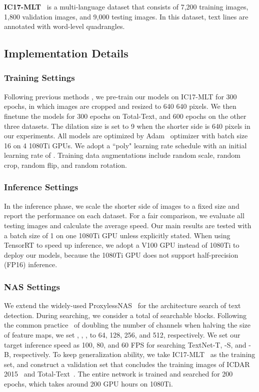 \documentclass[lettersize,journal]{IEEEtran}
\begin{document}
\noindent \textbf{IC17-MLT}~\cite{nayef2017icdar2017} is a multi-language dataset that consists of 7,200 training images, 1,800 validation images, and 9,000 testing images. In this dataset, text lines 
are annotated with word-level quadrangles. 


\subsection{Implementation Details}



\subsubsection{Training Settings} 
Following previous methods \cite{feng2019textdragon,wang2019shape,xie2021polarmask++,xie2019scene}, we pre-train our models on IC17-MLT for 300 epochs, in which images are cropped and resized to 640  640 pixels. 
We then finetune the models for 300 epochs on Total-Text, and 600 epochs on the other three datasets.
The dilation size  is set to 9 when the shorter side is 640 pixels in our experiments.
All models are optimized by Adam~\cite{kingma2014adam} optimizer with batch size 16 on 4 1080Ti GPUs.
We adopt a ``poly" learning rate schedule with an initial learning rate of .
Training data augmentations include random scale, random crop, random flip, and random rotation.



\subsubsection{Inference Settings}
In the inference phase, we scale the shorter side of images to a fixed size and report the performance on each dataset. 
For a fair comparison, we evaluate all testing images and calculate the average speed.
Our main results are tested with a batch size of 1 on one 1080Ti GPU unless explicitly stated.
When using TensorRT \cite{vanholder2016efficient} to speed up inference, we adopt a V100 GPU instead of 1080Ti to deploy our models, because the 1080Ti GPU does not support half-precision (FP16) inference.



\subsubsection{NAS Settings}
We extend the widely-used ProxylessNAS~\cite{cai2018proxylessnas} for the architecture search of text detection.
During searching, we consider a total of  searchable blocks.
Following the common practice~\cite{he2016deep} of doubling the number of channels when halving the size of feature maps, we set , , ,  to 64, 128, 256, and 512, respectively. 
We set our target inference speed  as 100, 80, and 60 FPS for searching TextNet-T, -S, and -B, respectively.
To keep generalization ability, we take IC17-MLT~\cite{nayef2017icdar2017} as the training set, and construct a validation set that concludes the training images of ICDAR 2015~\cite{karatzas2015icdar} and Total-Text~\cite{ch2017total}.
The entire network is trained and searched for 200 epochs, which takes around 200 GPU hours on 1080Ti.
\end{document}
